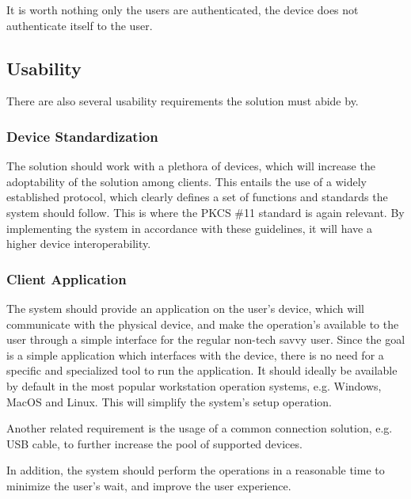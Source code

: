 It is worth nothing only the users are authenticated, the device does not authenticate itself to the user.

\subsection{Usability} \label{chap:problem:services:usability}
There are also several usability requirements the solution must abide by.

\subsubsection{Device Standardization}

The solution should work with a plethora of devices, which will increase the adoptability of the solution among clients. This entails the use of a widely established protocol, which clearly defines a set of functions and standards the system should follow.
This is where the PKCS \#11 standard is again relevant. By implementing the system in accordance with these guidelines, it will have a higher device interoperability.

\subsubsection{Client Application}

The system should provide an application on the user's device, which will communicate with the physical device, and make the operation's available to the user through a simple interface for the regular non-tech savvy user.
Since the goal is a simple application which interfaces with the device, there is no need for a specific and specialized tool to run the application. It should ideally be available by default in the most popular workstation operation systems, e.g. Windows, MacOS and Linux. This will simplify the system's setup operation.

Another related requirement is the usage of a common connection solution, e.g. USB cable, to further increase the pool of supported devices.

In addition, the system should perform the operations in a reasonable time to minimize the user's wait, and improve the user experience.
